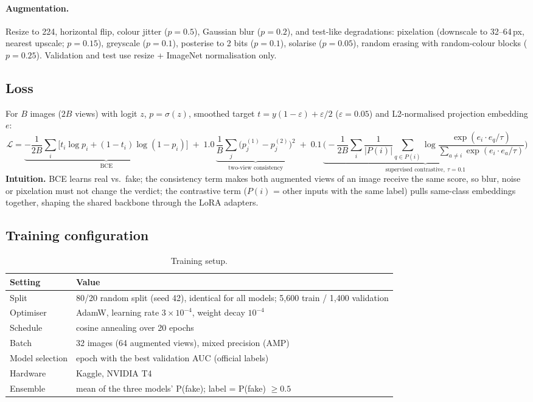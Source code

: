 \documentclass[11pt,a4paper]{article}
\begin{document}
\paragraph{Augmentation.} Resize to 224, horizontal flip, colour jitter ($p=0.5$), Gaussian blur ($p=0.2$), and test-like degradations: pixelation (downscale to 32--64\,px, nearest upscale; $p=0.15$), greyscale ($p=0.1$), posterise to 2 bits ($p=0.1$), solarise ($p=0.05$), random erasing with random-colour blocks ($p=0.25$). Validation and test use resize + ImageNet normalisation only.

\subsection{Loss}
For $B$ images ($2B$ views) with logit $z$, $p=\sigma(z)$, smoothed target $t = y(1-\varepsilon)+\varepsilon/2$ ($\varepsilon=0.05$) and L2-normalised projection embedding $e$:
\begin{equation}
\mathcal{L} =
\underbrace{-\frac{1}{2B}\sum_{i}\Big[t_i\log p_i+(1-t_i)\log(1-p_i)\Big]}_{\text{BCE}}
\;+\;1.0\,\underbrace{\frac{1}{B}\sum_{j}\big(p_j^{(1)}-p_j^{(2)}\big)^2}_{\text{two-view consistency}}
\;+\;0.1\,\underbrace{\Bigg(-\frac{1}{2B}\sum_{i}\frac{1}{|P(i)|}\sum_{q\in P(i)}\log\frac{\exp(e_i\!\cdot e_q/\tau)}{\sum_{a\neq i}\exp(e_i\!\cdot e_a/\tau)}\Bigg)}_{\text{supervised contrastive},\ \tau=0.1}
\end{equation}
\textbf{Intuition.} BCE learns real vs.\ fake; the consistency term makes both augmented views of an image receive the same score, so blur, noise or pixelation must not change the verdict; the contrastive term ($P(i)$ = other inputs with the same label) pulls same-class embeddings together, shaping the shared backbone through the LoRA adapters.

\subsection{Training configuration}
\begin{table}[H]
\centering\small
\begin{tabular}{@{}ll@{}}
\toprule
Setting & Value \\
\midrule
Split & 80/20 random split (seed 42), identical for all models; 5{,}600 train / 1{,}400 validation \\
Optimiser & AdamW, learning rate $3\times10^{-4}$, weight decay $10^{-4}$ \\
Schedule & cosine annealing over 20 epochs \\
Batch & 32 images (64 augmented views), mixed precision (AMP) \\
Model selection & epoch with the best validation AUC (official labels) \\
Hardware & Kaggle, NVIDIA T4 \\
Ensemble & mean of the three models' P(fake); label = P(fake) $\geq 0.5$ \\
\bottomrule
\end{tabular}
\caption{Training setup.}
\end{table}
\end{document}
